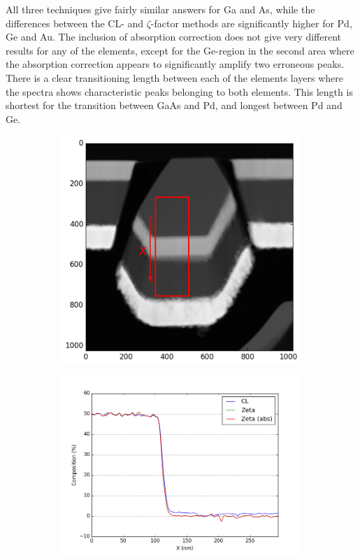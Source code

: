 All three techniques give fairly similar answers for Ga and As, while the differences between the CL- and $\zeta$-factor methods are significantly higher for Pd, Ge and Au. The inclusion of absorption correction does not give very different results for any of the elements, except for the Ge-region in the second area where the absorption correction appears to significantly amplify two erroneous peaks.
There is a clear transitioning length between each of the elements layers where the spectra shows characteristic peaks belonging to both elements. This length is shortest for the transition between GaAs and Pd, and longest between Pd and Ge.

\begin{figure}
	\begin{subfigure}{.5\textwidth}
		\centering
		\newlength\imageheight
		\includegraphics[width=.68\linewidth]{fig/q/1_overview3}
		\caption{}
		\label{fig:zeta_area1_overview}
	\end{subfigure}
	\begin{subfigure}{.45\textwidth}
		\centering
		\includegraphics[width=\linewidth]{fig/q/1_ga_nm}

\end{subfigure}
\end{figure}
